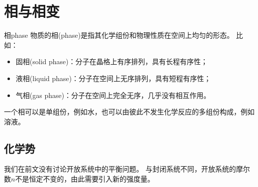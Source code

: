 \newcommand*{\phI}{\mathrm{I}}
\newcommand*{\phII}{\mathrm{II}}
\newcommand*{\phs}{\mathrm{s}}
\newcommand*{\phl}{\mathrm{l}}
\newcommand*{\phg}{\mathrm{g}}
\newcommand*{\phaq}{\mathrm{aq}}
\newcommand*{\phel}{\mathrm{el}}

\newcommand*{\rmA}{\mathrm{A}}
\newcommand*{\rmB}{\mathrm{B}}

\newcommand*{\crt}{\mathrm{C}}
\newcommand*{\tri}{_\mathrm{tr}}

\chapter{相与相变}
\label{chap:phase}

\begin{definition}
	{相}{phase}
	物质的相(phase)是指其化学组份和物理性质在空间上均匀的形态。
	比如：
	\begin{itemize}
		\item 固相(solid phase)：分子在晶格上有序排列，具有长程有序性；
		\item 液相(liquid phase)：分子在空间上无序排列，具有短程有序性；
		\item 气相(gas phase)：分子在空间上完全无序，几乎没有相互作用。
	\end{itemize}
\end{definition}

\begin{remark}
	一个相可以是单组份，例如水，也可以由彼此不发生化学反应的多组份构成，例如溶液。
\end{remark}


\section{化学势}
\label{sec:chemical potential}

我们在前文没有讨论开放系统中的平衡问题。
与封闭系统不同，开放系统的摩尔数$n$不是恒定不变的，由此需要引入新的强度量。


